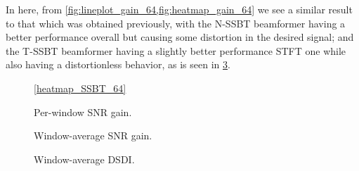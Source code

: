 In here, from \cref{fig:lineplot_gain_64,fig:heatmap_gain_64} we see a similar result to that which was obtained previously, with the N-SSBT beamformer having a better performance overall but causing some distortion in the desired signal; and the T-SSBT beamformer having a slightly better performance STFT one while also having a distortionless behavior, as is seen in \cref{fig:lineplot_dsdi_64}.



\begin{figure}[H]
	\centering
	
	
	\vspace*{0.4em}
	\ref*{heatmap_SSBT_64}
	\caption{Per-window SNR gain.}
	\label{fig:heatmap_gain_64}
\end{figure}

\begin{figure}[H]
\centering

\caption{Window-average SNR gain.}
\label{fig:lineplot_gain_64}
\end{figure}

\begin{figure}[H]
	\centering
	
	\caption{Window-average DSDI.}
	\label{fig:lineplot_dsdi_64}
\end{figure}